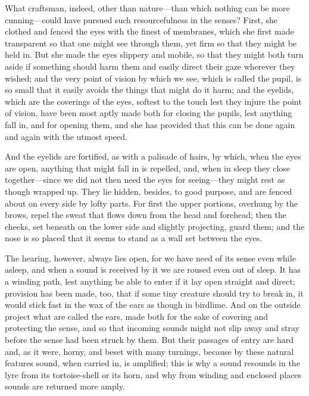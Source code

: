  What craftsman, indeed, other than nature—than which nothing can be more cunning—could have pursued such resourcefulness in the senses? First, she clothed and fenced the eyes with the finest of membranes, which she first made transparent so that one might see through them, yet firm so that they might be held in. But she made the eyes slippery and mobile, so that they might both turn aside if something should harm them and easily direct their gaze wherever they wished; and the very point of vision by which we see, which is called the pupil, is so small that it easily avoids the things that might do it harm; and the eyelids, which are the coverings of the eyes, softest to the touch lest they injure the point of vision, have been most aptly made both for closing the pupils, lest anything fall in, and for opening them, and she has provided that this can be done again and again with the utmost speed.

 And the eyelids are fortified, as with a palisade of hairs, by which, when the eyes are open, anything that might fall in is repelled, and, when in sleep they close together—since we did not then need the eyes for seeing—they might rest as though wrapped up. They lie hidden, besides, to good purpose, and are fenced about on every side by lofty parts. For first the upper portions, overhung by the brows, repel the sweat that flows down from the head and forehead; then the cheeks, set beneath on the lower side and slightly projecting, guard them; and the nose is so placed that it seems to stand as a wall set between the eyes.

 The hearing, however, always lies open, for we have need of its sense even while asleep, and when a sound is received by it we are roused even out of sleep. It has a winding path, lest anything be able to enter if it lay open straight and direct; provision has been made, too, that if some tiny creature should try to break in, it would stick fast in the wax of the ears as though in birdlime. And on the outside project what are called the ears, made both for the sake of covering and protecting the sense, and so that incoming sounds might not slip away and stray before the sense had been struck by them. But their passages of entry are hard and, as it were, horny, and beset with many turnings, because by these natural features sound, when carried in, is amplified; this is why a sound resounds in the lyre from its tortoise-shell or its horn, and why from winding and enclosed places sounds are returned more amply.

